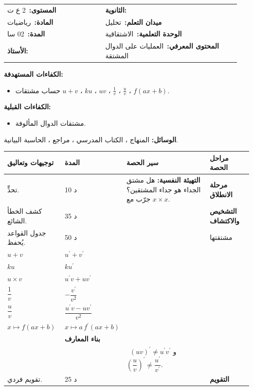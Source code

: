 \documentclass[12pt,a4paper]{article}
\makeatletter
\newenvironment{LTR}{\begin{otherlanguage}{english}}{\end{otherlanguage}}
\newcommand{\ar}[1]{\foreignlanguage{arabic}{#1}}
\newcommand{\Phase}[1]{\textbf{#1}}
\newcommand{\Fld}[2]{\textbf{#1:}\ #2}
\newcommand{\ModhHead}[9]{%
\begin{LTR}
\begin{tcolorbox}[enhanced,colback=white,colframe=cThm!85!black,arc=4mm,boxrule=1pt,top=14pt,bottom=6pt,left=8pt,right=8pt,
 overlay={\node[fill=cThm!85!black,text=white,rounded corners=3mm,inner xsep=14pt,inner ysep=4pt,font=\large\bfseries] at ([yshift=0pt]frame.north){\ar{مذكرة رقم #1}};},
 before upper={\selectlanguage{arabic}}]
\begin{tabular}{@{}p{0.4\linewidth}p{0.55\linewidth}@{}}
\Fld{المستوى}{#2} & \Fld{الثانوية}{\dotfill}\\[3pt]
\Fld{المادة}{رياضيات} & \Fld{ميدان التعلم}{#3}\\[3pt]
\Fld{المدة}{#5} & \Fld{الوحدة التعلمية}{#4}\\[3pt]
\Fld{الأستاذ}{\dotfill} & \Fld{المحتوى المعرفي}{#6}\\
\end{tabular}
\end{tcolorbox}
\begin{tcolorbox}[enhanced,colback=white,colframe=cThm!85!black,arc=3mm,boxrule=0.8pt,sidebyside,sidebyside align=top,lefthand ratio=0.5,
 segmentation style={dashed,cThm!60},before upper={\selectlanguage{arabic}},before lower={\selectlanguage{arabic}}]
\textbf{الكفاءات المستهدفة:}\par #8
\tcblower
\textbf{الكفاءات القبلية:}\par #7
\end{tcolorbox}
\end{LTR}
\par\smallskip\textbf{الوسائل:} #9\par\smallskip}
\newenvironment{Sayr}{%
\begin{LTR}\renewcommand{\arraystretch}{1.25}
\begin{longtable}{|p{0.17\textwidth}|>{\centering\arraybackslash}p{0.06\textwidth}|p{0.53\textwidth}|>{\centering\arraybackslash}p{0.12\textwidth}|}
\hline\rowcolor{cThm!12}\ar{\textbf{توجيهات وتعاليق}} & \ar{\textbf{المدة}} & \ar{\textbf{سير الحصة}} & \ar{\textbf{مراحل الحصة}}\\\hline\endhead
\hline\endfoot}{\end{longtable}\end{LTR}}
\newcommand{\Row}[4]{\ar{\small #4} & \ar{#3} & \ar{#2} & \cellcolor{cThm!8}\ar{\Phase{#1}}\\\hline}
\newcommand{\Lab}[2]{\foreignlanguage{english}{\tcbox[on line,colback=#1,colframe=#1,boxrule=0pt,arc=2pt,boxsep=1pt,left=5pt,right=5pt,top=1pt,bottom=1pt]{\ar{\textcolor{white}{\textbf{#2}}}}}}
\newcommand{\ck}{\ensuremath{{\color{cRem}\checkmark}}}
\makeatother
\begin{document}
\newpage
\ModhHead{14}{2 ع ت}{تحليل}{الاشتقاقية}{02 سا}{العمليات على الدوال المشتقة}%
{\begin{itemize}\item مشتقات الدوال المألوفة.\end{itemize}}%
{\begin{itemize}\item حساب مشتقات $u+v$ ، $ku$ ، $uv$ ، $\frac1v$ ، $\frac uv$ ، $f(ax+b)$.\end{itemize}}%
{المنهاج ، الكتاب المدرسي ، مراجع ، الحاسبة البيانية.}
\begin{Sayr}
\Row{مرحلة الانطلاق}{%
\textbf{التهيئة النفسية:} هل مشتق الجداء هو جداء المشتقين؟ جرّب مع $x\times x$.}{10 د}{تحدٍّ.}
\Row{التشخيص والاكتشاف}{%
\Lab{cEx}{وضعية مقترحة}\ $u(x)=x+1$ ، $v(x)=x-2$.\par\ck\ $(u\times v)(x)=x^2-x-2$ ، مشتقها $2x-1$ ؛ بينما $u^{\prime}\times v^{\prime}=1$.\par
\ck\ نتحقق أن $u^{\prime}v+uv^{\prime}=(x-2)+(x+1)=2x-1$.\par
}{35 د}{كشف الخطأ الشائع.}
\Row{بناء المعارف}{%
\Lab{cThm}{خاصية}\ $u$ و $v$ قابلتان للاشتقاق على $I$ ($v$ لا تنعدم على $I$ في حالة القسمة):\par\smallskip\begin{LTR}\centering {\footnotesize\renewcommand{\arraystretch}{1.6}\begin{tabular}{|c|c|}\hline
\rowcolor{cSec!12}\ar{الدالة} & \ar{مشتقتها}\\\hline
$u+v$ & $u^{\prime}+v^{\prime}$\\\hline
$ku$ & $ku^{\prime}$\\\hline
$u\times v$ & $u^{\prime}v+uv^{\prime}$\\\hline
$\dfrac1v$ & $-\dfrac{v^{\prime}}{v^2}$\\\hline
$\dfrac uv$ & $\dfrac{u^{\prime}v-uv^{\prime}}{v^2}$\\\hline
$x\mapsto f(ax+b)$ & $x\mapsto a\,f^{\prime}(ax+b)$\\\hline
\end{tabular}}\end{LTR}\par \Lab{cEx}{مثال}\par\ck\ $f(x)=\dfrac{2x+1}{x-1}$: $f^{\prime}(x)=\dfrac{2(x-1)-(2x+1)}{(x-1)^2}=\dfrac{-3}{(x-1)^2}$.\par
\ck\ $g(x)=\sqrt{2x+4}$: $g^{\prime}(x)=2\times\dfrac1{2\sqrt{2x+4}}=\dfrac1{\sqrt{2x+4}}$ على $]-2;+\infty[$.\par
}{50 د}{جدول القواعد يُحفظ.}
\Row{}{%
\Lab{cThm!80!black}{حذار}\ $(uv)^{\prime}\neq u^{\prime}v^{\prime}$ و $\left(\dfrac uv\right)^{\prime}\neq\dfrac{u^{\prime}}{v^{\prime}}$.}{}{}
\Row{التقويم}{%
\Lab{cEx}{تطبيق}\par احسب مشتقة $h(x)=(x^2+1)(x-3)$ بطريقتين (الجداء ، ثم بعد النشر).\par\textbf{الحل:} $h^{\prime}(x)=2x(x-3)+(x^2+1)=3x^2-6x+1$ ؛ وبالنشر $h(x)=x^3-3x^2+x-3$ نجد نفس النتيجة.\par\textbf{واجب منزلي:} تمارين 62 إلى 69 صفحتي 86 و 87.\par\smallskip\textbf{ملاحظات حول سير الحصة:} \dotfill}{25 د}{تقويم فردي.}
\end{Sayr}
\end{document}
